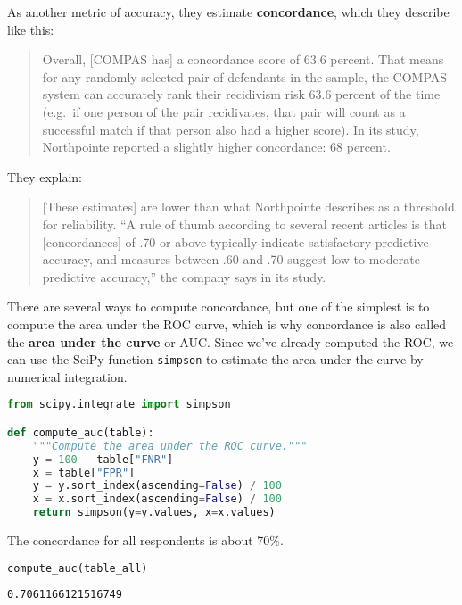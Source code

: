 As another metric of accuracy, they estimate \textbf{concordance}, which
they describe like this:

\begin{quote}
Overall, {[}COMPAS has{]} a concordance score of 63.6 percent. That
means for any randomly selected pair of defendants in the sample, the
COMPAS system can accurately rank their recidivism risk 63.6 percent of
the time (e.g.~if one person of the pair recidivates, that pair will
count as a successful match if that person also had a higher score). In
its study, Northpointe reported a slightly higher concordance: 68
percent.
\end{quote}

They explain:

\begin{quote}
{[}These estimates{]} are lower than what Northpointe describes as a
threshold for reliability. ``A rule of thumb according to several recent
articles is that {[}concordances{]} of .70 or above typically indicate
satisfactory predictive accuracy, and measures between .60 and .70
suggest low to moderate predictive accuracy,'' the company says in its
study.
\end{quote}

There are several ways to compute concordance, but one of the simplest
is to compute the area under the ROC curve, which is why concordance is
also called the \textbf{area under the curve} or AUC. Since we've
already computed the ROC, we can use the SciPy function
\passthrough{\lstinline!simpson!} to estimate the area under the curve
by numerical integration.

\begin{lstlisting}[language=Python,style=source]
from scipy.integrate import simpson

def compute_auc(table):
    """Compute the area under the ROC curve."""
    y = 100 - table["FNR"]
    x = table["FPR"]
    y = y.sort_index(ascending=False) / 100
    x = x.sort_index(ascending=False) / 100
    return simpson(y=y.values, x=x.values)
\end{lstlisting}

\pagebreak

The concordance for all respondents is about 70\%.

\begin{lstlisting}[language=Python,style=source]
compute_auc(table_all)
\end{lstlisting}

\begin{lstlisting}[style=output]
0.7061166121516749
\end{lstlisting}

